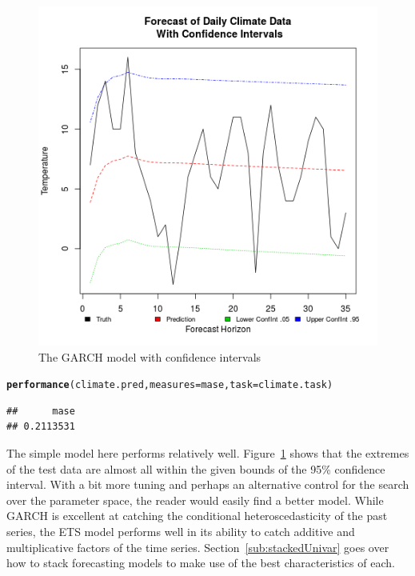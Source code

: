 \documentclass[12pt]{article}\usepackage[]{graphicx}\usepackage[]{color}
\makeatletter
\newcommand{\hlstd}[1]{\textcolor[rgb]{0.345,0.345,0.345}{#1}}%
\newcommand{\hlkwc}[1]{\textcolor[rgb]{0.333,0.667,0.333}{#1}}%
\newcommand{\hlkwd}[1]{\textcolor[rgb]{0.737,0.353,0.396}{\textbf{#1}}}%
\newenvironment{kframe}{%
 \def\at@end@of@kframe{}%
 \ifinner\ifhmode%
  \def\at@end@of@kframe{\end{minipage}}%
  \begin{minipage}{\columnwidth}%
 \fi\fi%
 \def\FrameCommand##1{\hskip\@totalleftmargin \hskip-\fboxsep
 \colorbox{shadecolor}{##1}\hskip-\fboxsep
     \hskip-\linewidth \hskip-\@totalleftmargin \hskip\columnwidth}%
 \MakeFramed {\advance\hsize-\width
   \@totalleftmargin\z@ \linewidth\hsize
   \@setminipage}}%
 {\par\unskip\endMakeFramed%
 \at@end@of@kframe}
\newenvironment{knitrout}{}{} %
\theoremstyle{definition}
\makeatother
\begin{document}
\begin{figure}[h!]
\includegraphics[width=\linewidth]{plot_garch_final.png}
\centering
\caption{The GARCH model with confidence intervals}
\label{fig:garch_final}
\end{figure}

\begin{knitrout}
\color{fgcolor}\begin{kframe}
\begin{alltt}
\hlkwd{performance}\hlstd{(climate.pred,} \hlkwc{measures} \hlstd{= mase,} \hlkwc{task} \hlstd{= climate.task)}
\end{alltt}
\begin{verbatim}
##      mase 
## 0.2113531
\end{verbatim}
\end{kframe}
\end{knitrout}

\doublespacing

The simple model here performs relatively well. Figure~\ref{fig:garch_final} shows that the extremes of the test data are almost all within the given bounds of the 95\% confidence interval. With a bit more tuning and perhaps an alternative control for the search over the parameter space, the reader would easily find a better model. While GARCH is excellent at catching the conditional heteroscedasticity of the past series, the ETS model performs well in its ability to catch additive and multiplicative factors of the time series. Section~\ref{sub:stackedUnivar} goes over how to stack forecasting models to make use of the best characteristics of each.
\end{document}
